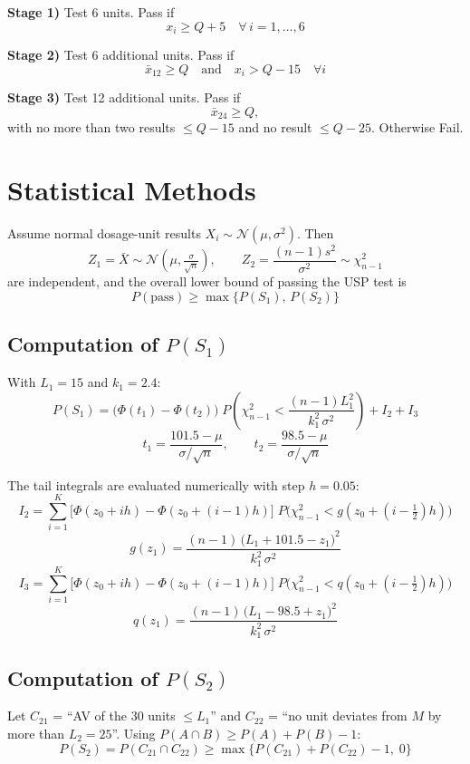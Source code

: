 \documentclass{article}
\begin{document}
\textbf{Stage 1)} Test 6 units. Pass if
$$x_i \ge Q + 5 \quad \forall\, i = 1,\dots,6$$

\textbf{Stage 2)} Test 6 additional units. Pass if
$$\bar{x}_{12} \ge Q \quad\text{and}\quad x_i > Q - 15 \quad \forall i$$

\textbf{Stage 3)} Test 12 additional units. Pass if
$$\bar{x}_{24} \ge Q,$$
with no more than two results $\le Q - 15$ and no result $\le Q - 25$. Otherwise Fail.

\section*{Statistical Methods}

Assume normal dosage-unit results $X_i \sim \mathcal{N}(\mu, \sigma^2)$. Then
$$Z_1 = \bar{X} \sim \mathcal{N}\!\left(\mu, \tfrac{\sigma}{\sqrt{n}}\right), \qquad Z_2 = \frac{(n-1)s^2}{\sigma^2} \sim \chi^2_{n-1}$$
are independent, and the overall lower bound of passing the USP test is
$$P(\text{pass}) \ge \max\{P(S_1),\, P(S_2)\}$$

\subsection*{Computation of $P(S_1)$}

With $L_1 = 15$ and $k_1 = 2.4$:
$$P(S_1) = \big(\Phi(t_1) - \Phi(t_2)\big)\; P\!\left(\chi^2_{n-1} < \frac{(n-1)L_1^2}{k_1^2\,\sigma^2}\right) + I_2 + I_3$$
$$t_1 = \frac{101.5 - \mu}{\sigma/\sqrt{n}}, \qquad t_2 = \frac{98.5 - \mu}{\sigma/\sqrt{n}}$$

The tail integrals are evaluated numerically with step $h = 0.05$:
$$I_2 = \sum_{i=1}^{K} \big[\Phi(z_0 + ih) - \Phi(z_0 + (i-1)h)\big]\; P\!\big(\chi^2_{n-1} < g(z_0 + (i-\tfrac{1}{2})h)\big)$$
$$g(z_1) = \frac{(n-1)\,\big(L_1 + 101.5 - z_1\big)^2}{k_1^2\,\sigma^2}$$
$$I_3 = \sum_{i=1}^{K} \big[\Phi(z_0 + ih) - \Phi(z_0 + (i-1)h)\big]\; P\!\big(\chi^2_{n-1} < q(z_0 + (i-\tfrac{1}{2})h)\big)$$
$$q(z_1) = \frac{(n-1)\,\big(L_1 - 98.5 + z_1\big)^2}{k_1^2\,\sigma^2}$$

\subsection*{Computation of $P(S_2)$}

Let $C_{21}$ = ``AV of the 30 units $\le L_1$'' and $C_{22}$ = ``no unit deviates from $M$ by more than $L_2 = 25$''. Using $P(A \cap B) \ge P(A) + P(B) - 1$:
$$P(S_2) = P(C_{21} \cap C_{22}) \ge \max\{P(C_{21}) + P(C_{22}) - 1,\; 0\}$$
\end{document}
